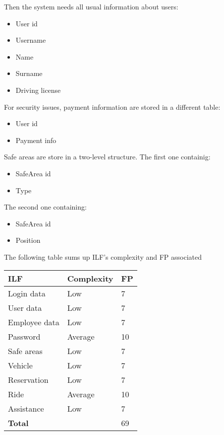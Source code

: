 Then the system needs all usual information about users:
\begin{itemize}
\item User id
\item Username
\item Name
\item Surname
\item Driving license
\end{itemize}

For security issues, payment information are stored in a different table:
\begin{itemize}
\item User id
\item Payment info
\end{itemize}


Safe areas are store in a two-level structure. The first one containig:
\begin{itemize}
\item SafeArea id
\item Type
\end{itemize}


The second one containing:
\begin{itemize}
\item SafeArea id
\item Position
\end{itemize}


The following table sums up ILF's complexity and FP associated
\\
\begin{tabular}{|p{5cm}|p{3cm}|p{2cm}|}
\hline
\textbf{ILF} & \textbf{Complexity} & \textbf{FP} \\
\hline

Login data & Low & 7\\
User data & Low & 7\\
Employee data & Low & 7\\
Password & Average & 10\\
Safe areas & Low & 7\\
Vehicle & Low & 7\\
Reservation & Low & 7\\
Ride & Average & 10\\
Assistance & Low & 7\\
\hline
\multicolumn{2}{|l|}{\textbf{Total}} & 69\\
\hline
\end{tabular}